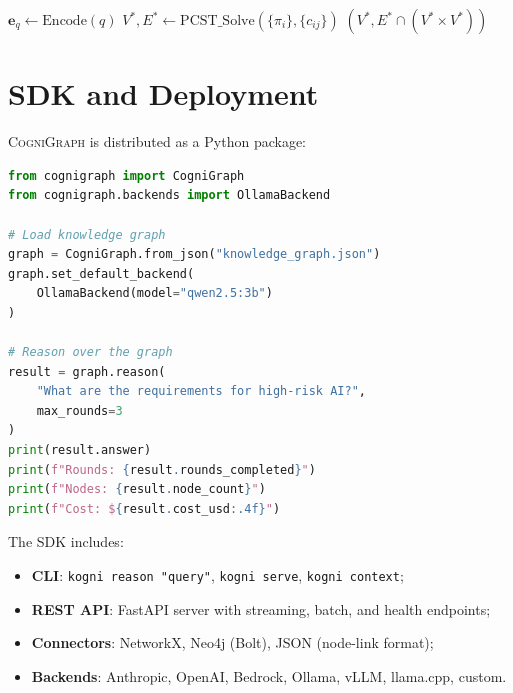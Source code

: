 \documentclass[a4paper,11pt]{article}
\theoremstyle{definition}
\newcommand{\cogni}{\textsc{CogniGraph}}
\begin{document}
\begin{algorithm}[ht]
\caption{PCST Subgraph Activation}
\label{alg:pcst}

$\mathbf{e}_q \gets \mathrm{Encode}(q)$\;
$V^*, E^* \gets \mathrm{PCST\_Solve}(\{\pi_i\}, \{c_{ij}\})$\;
\Return $(V^*, E^* \cap (V^* \times V^*))$\;
\end{algorithm}

\section{SDK and Deployment}
\label{sec:sdk}

\cogni{} is distributed as a Python package:

\begin{lstlisting}[language=Python,caption={CogniGraph SDK usage},label={lst:sdk}]
from cognigraph import CogniGraph
from cognigraph.backends import OllamaBackend

# Load knowledge graph
graph = CogniGraph.from_json("knowledge_graph.json")
graph.set_default_backend(
    OllamaBackend(model="qwen2.5:3b")
)

# Reason over the graph
result = graph.reason(
    "What are the requirements for high-risk AI?",
    max_rounds=3
)
print(result.answer)
print(f"Rounds: {result.rounds_completed}")
print(f"Nodes: {result.node_count}")
print(f"Cost: ${result.cost_usd:.4f}")
\end{lstlisting}

The SDK includes:
\begin{itemize}
\item \textbf{CLI}: \texttt{kogni reason "query"}, \texttt{kogni serve}, \texttt{kogni context};
\item \textbf{REST API}: FastAPI server with streaming, batch, and health endpoints;
\item \textbf{Connectors}: NetworkX, Neo4j (Bolt), JSON (node-link format);
\item \textbf{Backends}: Anthropic, OpenAI, Bedrock, Ollama, vLLM, llama.cpp, custom.
\end{itemize}
\end{document}
